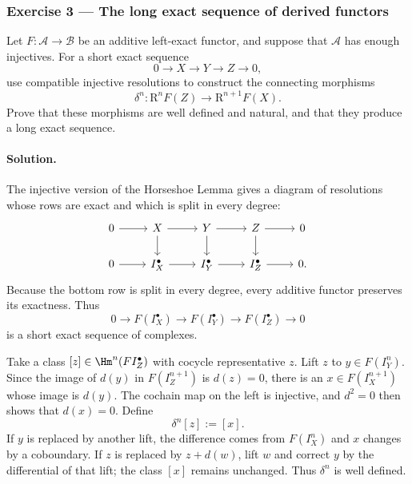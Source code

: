 \subsubsection*{Exercise 3 --- The long exact sequence of derived functors}
\hypertarget{o014.mastery.derived-spectral.002.ex03}{ }
\label{mastery:derived-spectral-002-ex03}

Let $F:\mathcal{A}\to\mathcal{B}$ be an additive left-exact functor, and
suppose that $\mathcal{A}$ has enough injectives. For a short exact sequence
\[
	0\longrightarrow X\longrightarrow Y\longrightarrow Z\longrightarrow0,
\]
use compatible injective resolutions to construct the connecting morphisms
\[
	\delta^n:\mathrm{R}^nF(Z)\longrightarrow\mathrm{R}^{n+1}F(X).
\]
Prove that these morphisms are well defined and natural, and that they
produce a long exact sequence.

\paragraph{Solution.}
\hypertarget{o014.mastery.derived-spectral.002.sol03}{ }
The injective version of the Horseshoe Lemma gives a diagram of resolutions
whose rows are exact and which is split in every degree:
\[
\begin{tikzcd}
	0 \arrow[r] & X \arrow[r] \arrow[d] & Y \arrow[r] \arrow[d] & Z \arrow[r] \arrow[d] & 0 \\
	0 \arrow[r] & I_X^\bullet \arrow[r] & I_Y^\bullet \arrow[r] & I_Z^\bullet \arrow[r] & 0.
\end{tikzcd}
\]
Because the bottom row is split in every degree, every additive functor
preserves its exactness. Thus
\[
	0\to F(I_X^\bullet)\to F(I_Y^\bullet)
	\to F(I_Z^\bullet)\to0
\]
is a short exact sequence of complexes.

Take a class $[z]\in\Hm^n(FI_Z^\bullet)$ with cocycle representative $z$.
Lift $z$ to $y\in F(I_Y^n)$. Since the image of $d(y)$ in
$F(I_Z^{n+1})$ is $d(z)=0$, there is an $x\in F(I_X^{n+1})$ whose image
is $d(y)$. The cochain map on the left is injective, and $d^2=0$ then shows
that $d(x)=0$. Define
\[
	\delta^n[z]:=[x].
\]
If $y$ is replaced by another lift, the difference comes from
$F(I_X^n)$ and $x$ changes by a coboundary. If $z$ is replaced by
$z+d(w)$, lift $w$ and correct $y$ by the differential of that lift; the
class $[x]$ remains unchanged. Thus $\delta^n$ is well defined.

